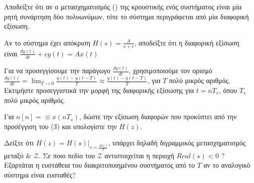 \documentclass{assignment}
\begin{document}
\begin{questions}

Αποδείξτε ότι αν ο μετασχηματισμός () της κρουστικής ενός συστήματος είναι μία
ρητή συνάρτηση δύο πολυωνύμων, τότε το σύστημα περιγράφεται από μία διαφορική εξίσωση.

Αν το σύστημα έχει απόκριση $H(s) = \frac{A}{s+c}$, αποδείξτε ότι η διαφορική εξίσωση είναι $\frac{dy(t)}{dt} + cy(t) = Ax(t)$

Για να προσεγγίσουμε την παράγωγο $\frac{dy(t)}{dt}$, χρησιμοποιούμε τον ορισμό 
$\frac{dy(t)}{dt} = \lim_{T\to 0}\frac{y(t) - y(t-T)}{T} \approx \frac{y(t) - y(t-T)}{T}$, για $T$ πολύ μικρός αριθμός. 
Εκτιμήστε προσεγγιστικά την μορφή της διαφορικής εξίσωσης για $t = nT_s$, όπου $T_s$ πολύ μικρός αριθμός.

Για $n[n] = \equiv x(nT_s)$, δώστε την εξίσωση διαφορών που προκύπτει από την προσέγγιση του (3) και υπολογίστε την $H(z)$.

Δείξτε ότι $H(z) = \left.H(s)\right|_{s=\frac{10z^{-1}}{T}}$, υπάρχει δηλαδή διγραμμικός μετασχηματισμός μεταξύ
 \& $\mathscr{Z}$. Σε ποιο πεδίο του $\mathscr{Z}$ αντιστοιχείται η περιοχή $Real(s) < 0$ ? Εξαρτάται η
ευστάθεια του διακριτοποιημένου συστήματος από το $T$ αν το αναλογικό σύστημα είναι ευσταθές?

\end{questions}

\solution
\end{document}
